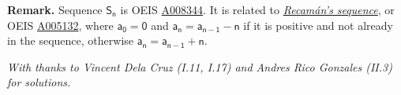 \documentclass[11pt,paper=letter]{scrartcl}
\begin{document}
\begin{enumerate}[left=0pt]
{\small \sffamily \textbf{Remark.} Sequence $\mathsf{S_n}$ is OEIS \href{http://oeis.org/A008344}{A008344}. It is related to \href{https://www.youtube.com/watch?v=FGC5TdIiT9U}{\emph{Recam\'{a}n's sequence}}, or OEIS \href{https://oeis.org/A005132}{A005132}, where $\mathsf{a_0 = 0}$ and $\mathsf{a_n = a_{n-1} - n}$ if it is positive and not already in the sequence, otherwise $\mathsf{a_n = a_{n-1} + n}$.}

\end{enumerate}

\emph{With thanks to Vincent Dela Cruz (I.11, I.17) and Andres Rico Gonzales (II.3) for solutions.}
\end{document}
